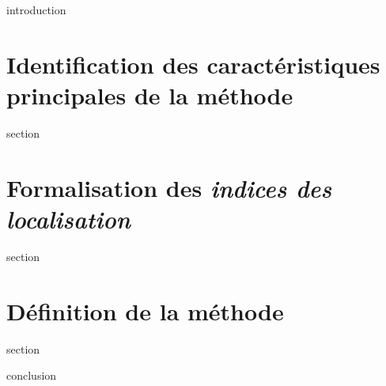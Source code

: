 \chaptertoc{}

\label{sec:4-int}
{introduction}

\section{Identification des caractéristiques principales de la
  méthode}
\label{sec:4-1}
{section}

\section{Formalisation des \emph{indices des localisation}}
{section}

\section{Définition de la méthode}
\label{sec:4-3}
{section}

\label{sec:4-cnc}
{conclusion}

